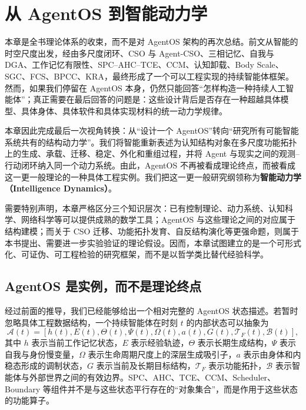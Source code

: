 \chapter{从 AgentOS 到智能动力学}
\label{chap:from-agentos-to-intelligence-dynamics}

\begin{chapterlead}
本章是全书理论体系的收束，而不是对 AgentOS 架构的再次总结。前文从智能的时空尺度出发，经由多尺度闭环、CSO 与 Agent-CSO、三相记忆、自我与 DGA、工作记忆有限性、SPC--AHC--TCE、CCM、认知卸载、Body Scale、SGC、FCS、BPCC、KRA，最终形成了一个可以工程实现的持续智能体框架。然而，如果我们停留在 AgentOS 本身，仍然只能回答“怎样构造一种持续人工智能体”；真正需要在最后回答的问题是：这些设计背后是否存在一种超越具体模型、具体身体、具体软件和具体实现材料的统一动力学规律。

本章因此完成最后一次视角转换：从“设计一个 AgentOS”转向“研究所有可能智能系统共有的结构动力学”。我们将智能重新表述为认知结构对象在多尺度功能拓扑上的生成、承载、迁移、稳定、外化和重组过程，并将 Agent 与现实之间的观测--行动闭环纳入同一个动力系统。由此，AgentOS 不再被看成理论终点，而被看成这一更一般理论的一种具体工程实例。我们把这一更一般研究纲领称为\textbf{智能动力学（Intelligence Dynamics）}。

需要特别声明，本章严格区分三个知识层次：已有控制理论、动力系统、认知科学、网络科学等可以提供成熟的数学工具；AgentOS 与这些理论之间的对应属于结构建模；而关于 CSO 迁移、功能拓扑发育、自反结构演化等更强命题，则属于本书提出、需要进一步实验验证的理论假设。因而，本章试图建立的是一个可形式化、可证伪、可工程检验的研究框架，而不是以哲学类比替代经验科学。
\end{chapterlead}


\section{AgentOS 是实例，而不是理论终点}

经过前面的推导，我们已经能够给出一个相对完整的 AgentOS 状态描述。若暂时忽略具体工程数据结构，一个持续智能体在时刻 $t$ 的内部状态可以抽象为
\begin{equation}
\mathcal{A}(t)
=
\left[
h(t),
E(t),
\Theta(t),
\Psi(t),
\Omega(t),
a(t),
G(t),
\mathcal{T}_{F}(t),
\mathcal{B}(t)
\right],
\end{equation}
其中 $h$ 表示当前工作记忆状态，$E$ 表示经验轨迹，$\Theta$ 表示长期生成结构，$\Psi$ 表示自我与身份慢变量，$\Omega$ 表示生命周期尺度上的深层生成吸引子，$a$ 表示由身体和内稳态形成的调制状态，$G$ 表示当前及长期目标结构，$\mathcal{T}_{F}$ 表示功能拓扑，$\mathcal{B}$ 表示智能体与外部世界之间的有效边界。SPC、AHC、TCE、CCM、Scheduler、Boundary 等组件并不是与这些状态平行存在的“对象集合”，而是作用于这些状态的功能算子。

